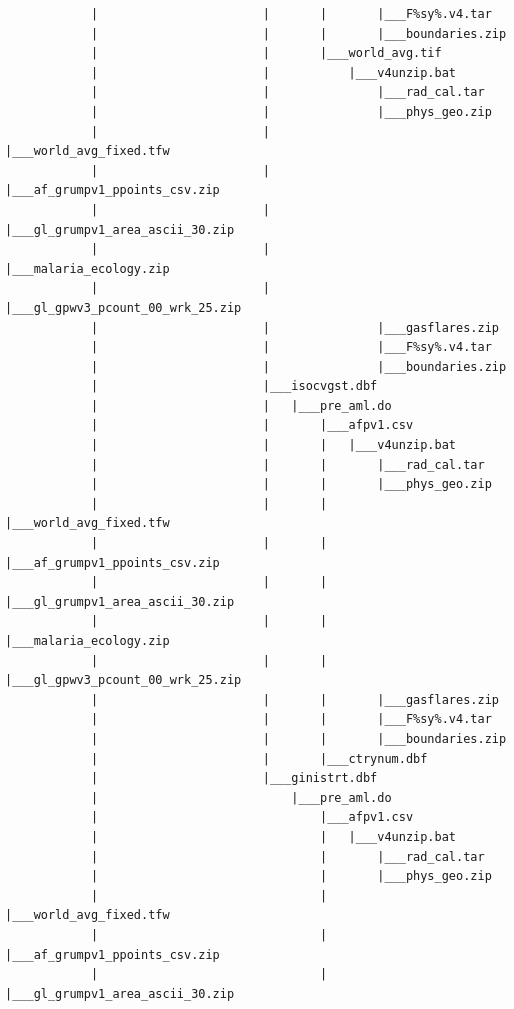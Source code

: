 \documentclass[
]{book}
\begin{document}
\begin{verbatim}
            |                       |       |       |___F%sy%.v4.tar
            |                       |       |       |___boundaries.zip
            |                       |       |___world_avg.tif
            |                       |           |___v4unzip.bat
            |                       |               |___rad_cal.tar
            |                       |               |___phys_geo.zip
            |                       |               |___world_avg_fixed.tfw
            |                       |               |___af_grumpv1_ppoints_csv.zip
            |                       |               |___gl_grumpv1_area_ascii_30.zip
            |                       |               |___malaria_ecology.zip
            |                       |               |___gl_gpwv3_pcount_00_wrk_25.zip
            |                       |               |___gasflares.zip
            |                       |               |___F%sy%.v4.tar
            |                       |               |___boundaries.zip
            |                       |___isocvgst.dbf
            |                       |   |___pre_aml.do
            |                       |       |___afpv1.csv
            |                       |       |   |___v4unzip.bat
            |                       |       |       |___rad_cal.tar
            |                       |       |       |___phys_geo.zip
            |                       |       |       |___world_avg_fixed.tfw
            |                       |       |       |___af_grumpv1_ppoints_csv.zip
            |                       |       |       |___gl_grumpv1_area_ascii_30.zip
            |                       |       |       |___malaria_ecology.zip
            |                       |       |       |___gl_gpwv3_pcount_00_wrk_25.zip
            |                       |       |       |___gasflares.zip
            |                       |       |       |___F%sy%.v4.tar
            |                       |       |       |___boundaries.zip
            |                       |       |___ctrynum.dbf
            |                       |___ginistrt.dbf
            |                           |___pre_aml.do
            |                               |___afpv1.csv
            |                               |   |___v4unzip.bat
            |                               |       |___rad_cal.tar
            |                               |       |___phys_geo.zip
            |                               |       |___world_avg_fixed.tfw
            |                               |       |___af_grumpv1_ppoints_csv.zip
            |                               |       |___gl_grumpv1_area_ascii_30.zip

\end{verbatim}
\end{document}
